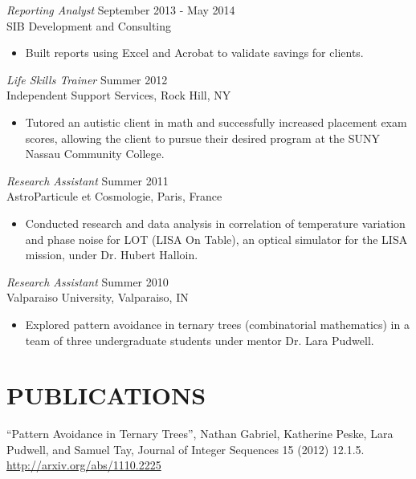 \documentclass[margin]{res}
\begin{document}
\begin{resume}
  {\sl Reporting Analyst} \hfill            September 2013 - May 2014 \\
  SIB Development and Consulting
  \begin{itemize}  \itemsep -2pt %
    \item Built reports using Excel and Acrobat to validate savings for clients.
  \end{itemize} 

  {\sl Life Skills Trainer} \hfill        Summer 2012 \\
  Independent Support Services, Rock Hill, NY
  \begin{itemize}
    \item Tutored an autistic client in math and successfully increased placement exam
      scores, allowing the client to pursue their desired program at the SUNY Nassau
      Community College.
  \end{itemize} 
 
  {\sl Research Assistant} \hfill        Summer 2011 \\
  AstroParticule et Cosmologie, Paris, France
  \begin{itemize}
    \item Conducted research and data analysis in correlation of temperature variation and
      phase noise for LOT (LISA On Table), an optical simulator for the LISA mission,
      under Dr. Hubert Halloin.
  \end{itemize} 

  {\sl Research Assistant} \hfill        Summer 2010 \\
  Valparaiso University, Valparaiso, IN
  \begin{itemize}
    \item Explored pattern avoidance in ternary trees (combinatorial mathematics) in a
      team of three undergraduate students under mentor Dr. Lara Pudwell.
  \end{itemize} 

\section{PUBLICATIONS}             
  “Pattern Avoidance in Ternary Trees”, Nathan Gabriel, Katherine Peske,
  Lara Pudwell, and Samuel Tay, Journal of Integer Sequences 15 (2012) 12.1.5. \\
  \url{http://arxiv.org/abs/1110.2225}

\end{resume}
\end{document}
